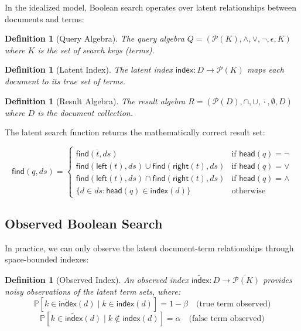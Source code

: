 \documentclass[11pt,final,hidelinks]{article}
\newtheorem{definition}[theorem]{Definition}
\newcommand{\obs}[1]{\widetilde{#1}}  %
\newcommand{\PS}[1]{\mathcal{P}(#1)}  %
\newcommand{\SetComplement}[1]{\overline{#1}}
\newcommand{\Find}{\mathsf{find}}     %
\newcommand{\MakeIndex}{\mathsf{index}}
\newcommand{\OMakeIndex}{\obs{\mathsf{index}}}
\newcommand{\Head}{\mathsf{head}}
\newcommand{\Left}{\mathsf{left}}
\newcommand{\Right}{\mathsf{right}}
\newcommand{\ProbCond}[2]{\mathbb{P}\left[#1 \mid #2\right]}
\newcommand{\fprate}{\alpha}
\newcommand{\fnrate}{\beta}
\begin{document}
In the idealized model, Boolean search operates over latent relationships between documents and terms:

\begin{definition}[Query Algebra]
The query algebra $Q = (\PS{K}, \land, \lor, \neg, \epsilon, K)$ where $K$ is the set of search keys (terms).
\end{definition}

\begin{definition}[Latent Index]
The latent index $\MakeIndex : D \to \PS{K}$ maps each document to its true set of terms.
\end{definition}

\begin{definition}[Result Algebra]
The result algebra $R = (\PS{D}, \cap, \cup, \overline{\cdot}, \emptyset, D)$ where $D$ is the document collection.
\end{definition}

The latent search function returns the mathematically correct result set:

\begin{equation}
\Find(q, ds) = \begin{cases}
    \SetComplement{\Find(t, ds)} & \text{if } \Head(q) = \neg \\
    \Find(\Left(t), ds) \cup \Find(\Right(t), ds) & \text{if } \Head(q) = \lor \\
    \Find(\Left(t), ds) \cap \Find(\Right(t), ds) & \text{if } \Head(q) = \land \\
    \{d \in ds : \Head(q) \in \MakeIndex(d)\} & \text{otherwise}
\end{cases}
\end{equation}

\subsection{Observed Boolean Search}

In practice, we can only observe the latent document-term relationships through space-bounded indexes:

\begin{definition}[Observed Index]
An observed index $\OMakeIndex : D \to \obs{\PS{K}}$ provides noisy observations of the latent term sets, where:
\begin{equation}
\ProbCond{k \in \OMakeIndex(d)}{k \in \MakeIndex(d)} = 1 - \fnrate \quad \text{(true term observed)}
\end{equation}
\begin{equation}
\ProbCond{k \in \OMakeIndex(d)}{k \notin \MakeIndex(d)} = \fprate \quad \text{(false term observed)}
\end{equation}
\end{definition}
\end{document}
